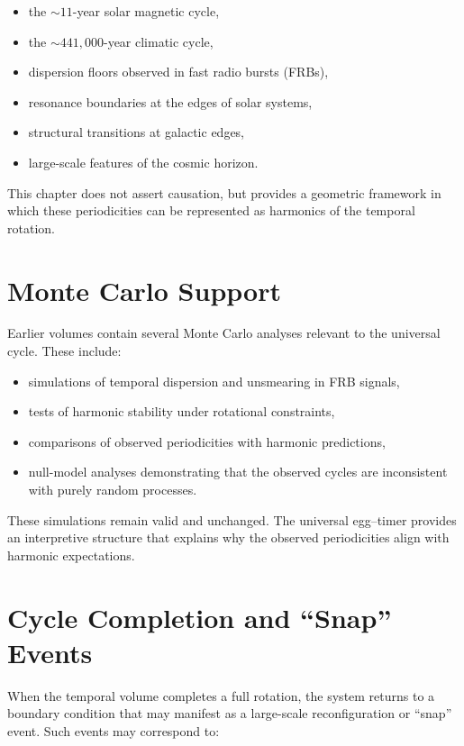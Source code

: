 \documentclass[11pt, letterpaper, openany]{book}
\begin{document}
\begin{itemize}
    \item the $\sim 11$-year solar magnetic cycle,
    \item the $\sim 441{,}000$-year climatic cycle,
    \item dispersion floors observed in fast radio bursts (FRBs),
    \item resonance boundaries at the edges of solar systems,
    \item structural transitions at galactic edges,
    \item large-scale features of the cosmic horizon.
\end{itemize}

This chapter does not assert causation, but provides a geometric framework in 
which these periodicities can be represented as harmonics of the temporal 
rotation.

\section{Monte Carlo Support}

Earlier volumes contain several Monte Carlo analyses relevant to the universal 
cycle. These include:

\begin{itemize}
    \item simulations of temporal dispersion and unsmearing in FRB signals,
    \item tests of harmonic stability under rotational constraints,
    \item comparisons of observed periodicities with harmonic predictions,
    \item null-model analyses demonstrating that the observed cycles are 
          inconsistent with purely random processes.
\end{itemize}

These simulations remain valid and unchanged. 
The universal egg--timer provides an interpretive structure that explains 
why the observed periodicities align with harmonic expectations.

\section{Cycle Completion and ``Snap'' Events}

When the temporal volume completes a full rotation, the system returns to a 
boundary condition that may manifest as a large-scale reconfiguration or 
``snap'' event. 
Such events may correspond to:
\end{document}
